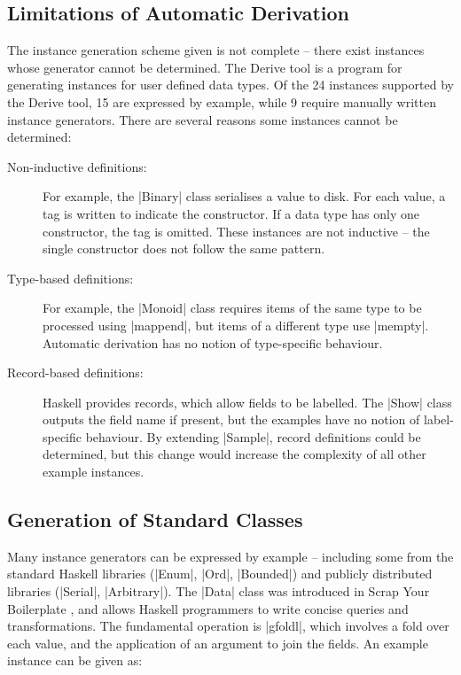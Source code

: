 \documentclass[preprint]{sigplanconf}
\begin{document}
\subsection{Limitations of Automatic Derivation}
\label{sec:failure}

The instance generation scheme given is not complete -- there exist instances whose generator cannot be determined. The Derive tool \cite{derive} is a program for generating instances for user defined data types. Of the 24 instances supported by the Derive tool, 15 are expressed by example, while 9 require manually written instance generators. There are several reasons some instances cannot be determined:

\begin{description}

\item[Non-inductive definitions:] For example, the |Binary| class serialises a value to disk. For each value, a tag is written to indicate the constructor. If a data type has only one constructor, the tag is omitted. These instances are not inductive -- the single constructor does not follow the same pattern.

\item[Type-based definitions:] For example, the |Monoid| class requires items of the same type to be processed using |mappend|, but items of a different type use |mempty|. Automatic derivation has no notion of type-specific behaviour.

\item [Record-based definitions:] Haskell provides records, which allow fields to be labelled. The |Show| class outputs the field name if present, but the examples have no notion of label-specific behaviour. By extending |Sample|, record definitions could be determined, but this change would increase the complexity of all other example instances.

\end{description}

\subsection{Generation of Standard Classes}
\label{sec:automatic_success}

Many instance generators can be expressed by example -- including some from the standard Haskell libraries (|Enum|, |Ord|, |Bounded|) and publicly distributed libraries (|Serial|, |Arbitrary|). The |Data| class was introduced in Scrap Your Boilerplate \cite{lammel:syb}, and allows Haskell programmers to write concise queries and transformations. The fundamental operation is |gfoldl|, which involves a fold over each value, and the application of an argument to join the fields. An example instance can be given as:
\end{document}
